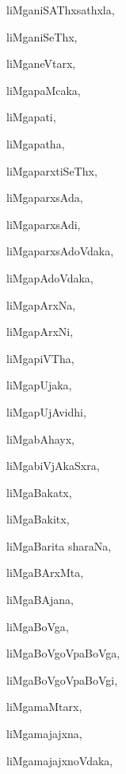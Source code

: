 \begin{multicols}{3}
{\noindent
{liMganiSAThxsathxla}, \pageref{liMganiSAThxsathxla}

\noindent
{liMganiSeThx}, \pageref{liMganiSeThx}

\noindent
{liMganeVtarx}, \pageref{liMganeVtarx}

\noindent
{liMgapaMcaka}, \pageref{liMgapaMcaka}

\noindent
{liMgapati}, \pageref{liMgapati}

\noindent
{liMgapatha}, \pageref{liMgapatha}

\noindent
{liMgaparxtiSeThx}, \pageref{liMgaparxtiSeThx}

\noindent
{liMgaparxsAda}, \pageref{liMgaparxsAda}

\noindent
{liMgaparxsAdi}, \pageref{liMgaparxsAdi}

\noindent
{liMgaparxsAdoVdaka}, \pageref{liMgaparxsAdoVdaka}

\noindent
{liMgapAdoVdaka}, \pageref{liMgapAdoVdaka}

\noindent
{liMgapArxNa}, \pageref{liMgapArxNa}

\noindent
{liMgapArxNi}, \pageref{liMgapArxNi}

\noindent
{liMgapiVTha}, \pageref{liMgapiVTha}

\noindent
{liMgapUjaka}, \pageref{liMgapUjaka}

\noindent
{liMgapUjAvidhi}, \pageref{liMgapUjAvidhi}

\noindent
{liMgabAhayx}, \pageref{liMgabAhayx}

\noindent
{liMgabiVjAkaSxra}, \pageref{liMgabiVjAkaSxra}

\noindent
{liMgaBakatx}, \pageref{liMgaBakatx}

\noindent
{liMgaBakitx}, \pageref{liMgaBakitx}

\noindent
{liMgaBarita sharaNa}, \pageref{liMgaBaritasharaNa}

\noindent
{liMgaBArxMta}, \pageref{liMgaBArxMta}

\noindent
{liMgaBAjana}, \pageref{liMgaBAjana}

\noindent
{liMgaBoVga}, \pageref{liMgaBoVga}

\noindent
{liMgaBoVgoVpaBoVga}, \pageref{liMgaBoVgoVpaBoVga}

\noindent
{liMgaBoVgoVpaBoVgi}, \pageref{liMgaBoVgoVpaBoVgi}

\noindent
{liMgamaMtarx}, \pageref{liMgamaMtarx}

\noindent
{liMgamajajxna}, \pageref{liMgamajajxna}

\noindent
{liMgamajajxnoVdaka}, \pageref{liMgamajajxnoVdaka}

}
\end{multicols}
